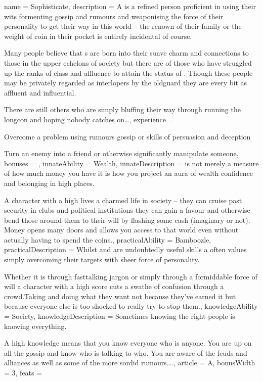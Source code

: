\archetype
{
	name = Sophisticate,
	description = A \bname{} is a refined person\comma{} proficient in using their wits\comma{} formenting gossip and rumours\comma{} and weaponising the force of their personality to get their way in this world – the renown of their family\comma{} or the weight of coin in their pocket is entirely incidental\comma{} of course. 

Many people believe that \name{}s are born into their suave\comma{} charm and connections to those in the upper echelons of society\comma{} but there are of those who have struggled up the ranks of class and affluence to attain the status of \bname{}. Though these people may be privately regarded as interlopers by the old\minus{}guard\comma{} they are every bit as affluent and influential. 

There are still others who are simply bluffing their way through\comma{} running the long\minus{}con and hoping nobody catches on…,
	experience = \item Overcome a  problem using rumours\comma{} gossip or skills of persuasion and deception
\item Turn an enemy into a friend\comma{} or otherwise significantly manipulate someone,
	bonuses = 
,
	innateAbility = Wealth,
	innateDescription =  is not merely a measure of how much money you have\comma{} it is how you project an aura of wealth\comma{} confidence and belonging in high places. 

A character with a high  lives a charmed life in society – they can cruise past security in clubs and political institutions\comma{} they can gain a favour and otherwise bend those around them to their will by flashing some cash (imaginary or not). Money opens many doors\comma{} and  allows you access to that world\comma{} even without actually having to spend the coins.,
	practicalAbility = Bamboozle,
	practicalDescription = Whilst \comma{}  and  are undoubtedly useful skills\comma{} a \bname{} often values simply overcoming their targets with sheer force of personality. 

Whether it is through fast\minus{}talking jargon\comma{} or simply through a formiddable force of will\comma{} a character with a high  score cuts a swathe of confusion through a crowd.Taking and doing what they want not because they’ve earned it\comma{} but because everyone else is too shocked to really try to stop them.,
	knowledgeAbility = Society,
	knowledgeDescription = Sometimes\comma{} knowing the right people is knowing everything. 

A high  knowledge means that you know everyone who is anyone. You are up on all the gossip and know who is talking to who. You are aware of the feuds and alliances\comma{} as well as some of the more sordid rumours….,
	article = A,
	bonusWidth = 3, feats = \SophisticateFeats
}

